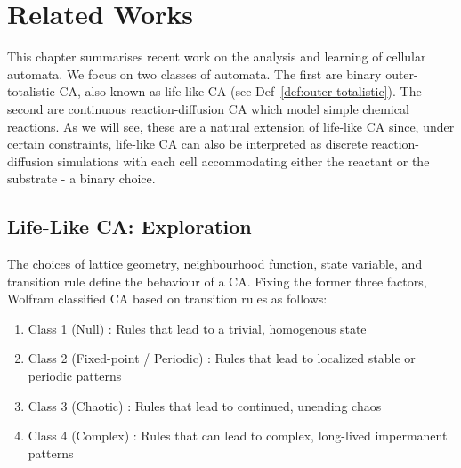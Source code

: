 \chapter{Related Works}

This chapter summarises recent work on the analysis and learning of cellular automata. We focus on two classes of automata. The first are binary outer-totalistic CA, also known as life-like CA (see Def~\ref{def:outer-totalistic}). The second are continuous reaction-diffusion CA which model simple chemical reactions. As we will see, these are a natural extension of life-like CA since, under certain constraints, life-like CA can also be interpreted as discrete reaction-diffusion simulations with each cell accommodating either the reactant or the substrate - a binary choice.

\section{Life-Like CA: Exploration} \label{sec: life-like-exploration}

The choices of lattice geometry, neighbourhood function, state variable, and transition rule define the behaviour of a CA. Fixing the former three factors, Wolfram\cite{wolfram1986theory} classified CA based on transition rules as follows:
\begin{definition}\label{def:wolfram-classes}
\begin{enumerate}
  \item Class 1 (Null) : Rules that lead to a trivial, homogenous state
  \item Class 2 (Fixed-point / Periodic) : Rules that lead to localized stable or periodic patterns
  \item Class 3 (Chaotic) : Rules that lead to continued, unending chaos
  \item Class 4 (Complex) : Rules that can lead to complex, long-lived impermanent patterns
\end{enumerate}
\end{definition}

